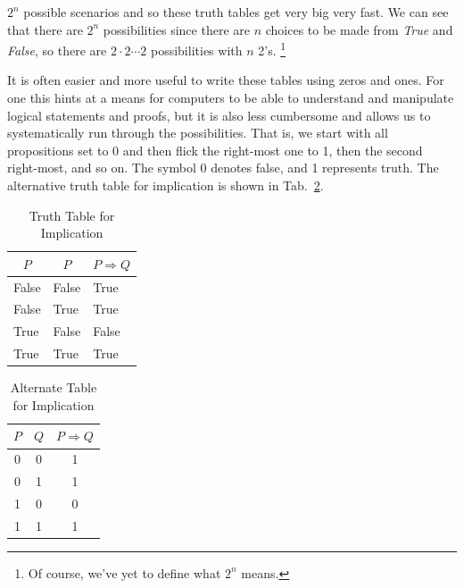         $2^{n}$ possible scenarios and so these truth tables get very big very
        fast. We can see that there are $2^{n}$ possibilities since there are
        $n$ choices to be made from \textit{True} and \textit{False}, so there
        are $2\cdot{2}\cdots{2}$ possibilities with $n$ 2's.%
        \footnote{Of course, we've yet to define what $2^{n}$ means.}
        \par\hfill\par
        It is often easier and more useful to write these tables using zeros and
        ones. For one this hints at a means for computers to be able to
        understand and manipulate logical statements and proofs, but it is also
        less cumbersome and allows us to systematically run through the
        possibilities. That is, we start with all propositions set to 0 and then
        flick the right-most one to 1, then the second right-most, and so on.
        The symbol 0 denotes false, and 1 represents truth. The alternative
        truth table for implication is shown in
        Tab.~\ref{tab:Alternate_Truth_Table_Implication}.
        \par
        \begin{minipage}[b]{0.49\textwidth}
            \centering
            \begin{table}[H]
                \centering
                \captionsetup{type=table}
                \begin{tabular}{l|l|l}
                    \multicolumn{1}{c|}{$P$}&\multicolumn{1}{c|}{$P$}&
                    \multicolumn{1}{c}{$P\Rightarrow{Q}$}\\
                    \hline
                    False&False&True\\
                    False&True&True\\
                    True&False&False\\
                    True&True&True
                \end{tabular}
                \caption{Truth Table for Implication}
                \label{tab:Truth_Table_Implication}
            \end{table}
        \end{minipage}\hfill
        \begin{minipage}[b]{0.49\textwidth}
            \centering
            \begin{table}[H]
                \centering
                \captionsetup{type=table}
                \begin{tabular}{c|c|c}
                    $P$&$Q$&$P\Rightarrow{Q}$\\
                    \hline
                    0&0&1\\
                    0&1&1\\
                    1&0&0\\
                    1&1&1
                \end{tabular}
                \caption{Alternate Table for Implication}
                \label{tab:Alternate_Truth_Table_Implication}
            \end{table}
        \end{minipage}
